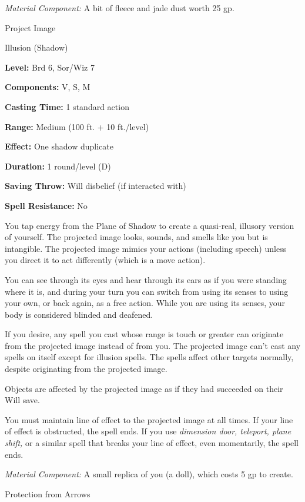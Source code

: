 \documentclass{article}
\begin{document}
\textit{Material Component: }A bit of fleece and jade dust worth 25 gp.

\vspace{12pt}
Project Image

Illusion (Shadow)

\textbf{Level:} Brd 6, Sor/Wiz 7

\textbf{Components:} V, S, M

\textbf{Casting Time:} 1 standard action

\textbf{Range:} Medium (100 ft. + 10 ft./level)

\textbf{Effect:} One shadow duplicate

\textbf{Duration:} 1 round/level (D)

\textbf{Saving Throw: }Will disbelief (if interacted with)

\textbf{Spell Resistance:} No

You tap energy from the Plane of Shadow to create a quasi-real, illusory version 
of yourself. The projected image looks, sounds, and smells like you but is intangible. 
The projected image mimics your actions (including speech) unless you direct it 
to act differently (which is a move action).

You can see through its eyes and hear through its ears as if you were standing 
where it is, and during your turn you can switch from using its senses to using 
your own, or back again, as a free action. While you are using its senses, your 
body is considered blinded and deafened.

If you desire, any spell you cast whose range is touch or greater can originate 
from the projected image instead of from you. The projected image can't cast any 
spells on itself except for illusion spells. The spells affect other targets normally, 
despite originating from the projected image.

Objects are affected by the projected image as if they had succeeded on their Will 
save.

You must maintain line of effect to the projected image at all times. If your line 
of effect is obstructed, the spell ends. If you use \textit{dimension door, teleport, 
plane shift, }or a similar spell that breaks your line of effect, even momentarily, 
the spell ends.

\textit{Material Component: }A small replica of you (a doll), which costs 5 gp 
to create.

\vspace{12pt}
Protection from Arrows
\end{document}
